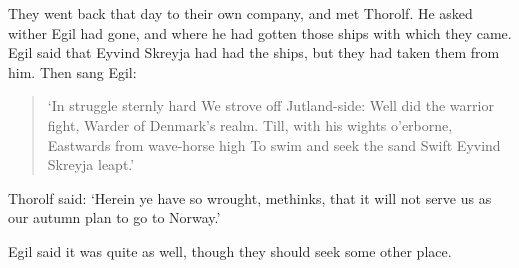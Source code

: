 They went back that day to their own company, and met Thorolf. He asked wither Egil had gone, and where he had gotten those ships with which they came. Egil said that Eyvind Skreyja had had the ships, but they had taken them from him. Then sang Egil:

\begin{verse}
`In struggle sternly hard
We strove off Jutland-side:
Well did the warrior fight,
Warder of Denmark's realm.
Till, with his wights o'erborne,
Eastwards from wave-horse high
To swim and seek the sand
Swift Eyvind Skreyja leapt.'
\end{verse}

Thorolf said: `Herein ye have so wrought, methinks, that it will not serve us as our autumn plan to go to Norway.'

Egil said it was quite as well, though they should seek some other place.
